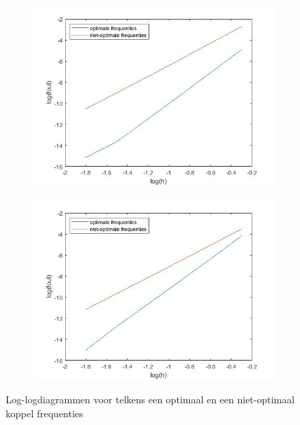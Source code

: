 \documentclass[12pt]{article}
\begin{document}
\begin{figure}[H]
    \centering
    \begin{subfigure}{0.49\textwidth}
        \includegraphics[width=\textwidth]{loglog1.jpg}
    \end{subfigure}
    \begin{subfigure}{0.49\textwidth}
        \includegraphics[width=\textwidth]{loglogk.jpg}
    \end{subfigure}
    \caption{Log-logdiagrammen voor telkens een optimaal en een niet-optimaal koppel frequenties}
    \label{fig:simpleorder}
\end{figure}
\end{document}

